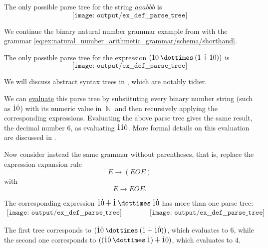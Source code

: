 \begin{example}
\begin{thmenum}
    The only possible parse tree for the string \( aaabbb \) is
    \begin{equation*}
      \texttt{[image: output/ex\_\_def\_\_parse\_tree]}
    \end{equation*}

     We continue the binary natural number grammar example from  with the grammar \eqref{eq:ex:natural_number_arithmetic_grammar/schema/shorthand}.

    The only possible parse tree for the expression \( (\syn1 \syn0 \syntimes (\syn1 \synplus \syn1 \syn0)) \) is
    \begin{equation*}
      \texttt{[image: output/ex\_\_def\_\_parse\_tree]}
    \end{equation*}

    We will discuss abstract syntax trees in , which are notably tidier.

    We can \hyperref[con:evaluation]{evaluate} this parse tree by substituting every binary number string (such as \( \dot{1} \dot{0} \)) with its numeric value in \( \BbbN \) and then recursively applying the corresponding expressions. Evaluating the above parse tree gives the same result, the decimal number \( 6 \), as evaluating \( \dot{1} \dot{1} \dot{0} \). More formal details on this evaluation are discussed in .

    Now consider instead the same grammar without parentheses, that is, replace the expression expansion rule
    \begin{equation*}
      E \to (E O E)
    \end{equation*}
    with
    \begin{equation*}
      E \to E O E.
    \end{equation*}

    The corresponding expression \( \syn1 \syn0 \synplus \syn1 \syntimes \syn1 \syn0 \) has more than one parse tree:
    \begin{equation*}
      \begin{aligned}
        \texttt{[image: output/ex\_\_def\_\_parse\_tree]}
        \qquad\qquad
        \texttt{[image: output/ex\_\_def\_\_parse\_tree]}
      \end{aligned}
    \end{equation*}

    The first tree corresponds to \( (\syn1\syn0 \syntimes (\syn1 \synplus \syn1\syn0)) \), which evaluates to \( 6 \), while the second one corresponds to \( ((\syn1 \syn0 \syntimes \syn1) \synplus \syn1\syn0) \), which evaluates to \( 4 \).


\end{thmenum}
\end{example}

